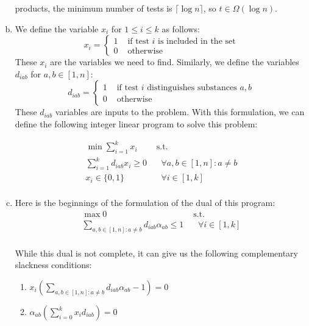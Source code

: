 \documentclass[fleqn]{homework}
\begin{document}
\begin{problem}{1}
\begin{enumerate}[a.]
      products, the minimum number of tests is $\lceil \log n \rceil$, so
      $t \in \Omega(\log n)$.
    \item We define the variable $x_i$ for $1 \le i \le k$ as follows:
      \begin{equation*}
        x_i = \left\{\begin{array}{ll}
            1 &\text{ if test }i\text{ is included in the set} \\
            0 &\text{ otherwise}
          \end{array}\right.
      \end{equation*}
      These $x_i$ are the variables we need to find.  Similarly, we define the
      variables $d_{iab}$ for $a,b \in [1, n]$:
      \begin{equation*}
        d_{iab} = \left\{\begin{array}{ll}
                           1 &\text{ if test }i\text{ distinguishes substances }a,b \\
                           0 &\text{ otherwise}
                         \end{array}\right.
      \end{equation*}
      These $d_{iab}$ variables are inputs to the problem.  With this
      formulation, we can define the following integer linear program to solve
      this problem:

      \begin{align*}
        \min \sum_{i=1}^k x_i &\text{ s.t.} \\
        \sum_{i=1}^k d_{iab} x_i \ge 0 &\:\:\:\: \forall a,b \in [1,n]: a \ne b \\
        x_i \in \{0,1\} &\:\:\:\: \forall i \in [1, k] \\
      \end{align*}
    \item Here is the beginnings of the formulation of the dual of this program:
      \begin{align*}
        \max 0 &\text{ s.t.} \\
        \sum_{a,b \in [1,n]: a \ne b} d_{iab} \alpha_{ab} \le 1 &\:\:\:\: \forall i \in [1,k] \\
      \end{align*}

      While this dual is not complete, it can give us the following
      complementary slackness conditions:

      \begin{enumerate}
      \item $x_i \left(\sum_{a,b \in [1,n]: a \ne b} d_{iab} \alpha_{ab} - 1\right) = 0$
      \item $\alpha_{ab} \left(\sum_{i=0}^k x_i d_{iab}\right) = 0$
      \end{enumerate}


\end{enumerate}
\end{problem}
\end{document}
